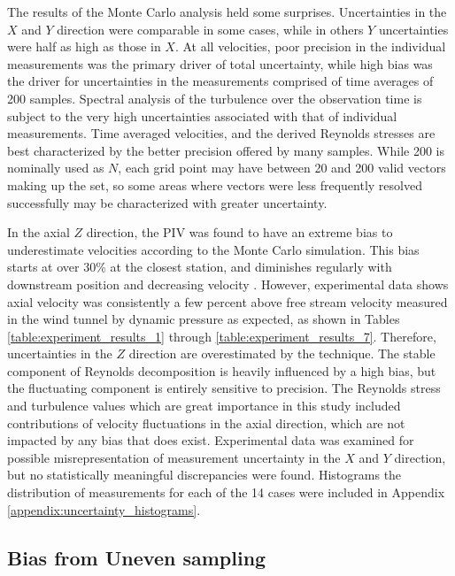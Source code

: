 {



The results of the Monte Carlo analysis held some surprises. Uncertainties in 
the $X$ and $Y$ direction were comparable in some cases, while in others $Y$ 
uncertainties were half as high as those in $X$. At all velocities, poor 
precision in the individual measurements was the primary driver of total 
uncertainty, while high bias was the driver for uncertainties in the 
measurements comprised of time averages of 200 samples. Spectral analysis of 
the turbulence over the observation time is subject to the very high 
uncertainties associated with that of individual measurements. Time averaged 
velocities, and the derived Reynolds stresses are best characterized by the 
better precision offered by many samples. While 200 is nominally used as $N$, 
each grid point may have between 20 and 200 valid vectors making up the set, so 
some areas where vectors were less frequently resolved successfully may be 
characterized with greater uncertainty.

In the axial $Z$ direction, the PIV was found to have an extreme bias to 
underestimate velocities according to the Monte Carlo simulation. This bias 
starts at over 30\% at the closest station, and diminishes regularly with 
downstream position and decreasing velocity . However, experimental data shows 
axial velocity was consistently a few percent above free stream velocity 
measured in the wind tunnel by dynamic pressure as expected, as shown in Tables
\ref{table:experiment_results_1} through \ref{table:experiment_results_7}. 
Therefore, uncertainties in the $Z$ direction are overestimated by the 
technique. The stable component of Reynolds decomposition is heavily influenced 
by a high bias, but the fluctuating component is entirely sensitive to 
precision. The Reynolds stress and turbulence values which are great importance 
in this study included contributions of velocity fluctuations in the axial 
direction, which are not impacted by any bias that does exist. Experimental 
data was examined for possible misrepresentation of measurement uncertainty in 
the $X$ and $Y$ direction, but no statistically meaningful discrepancies were 
found. Histograms the distribution of measurements for each of the 14 
cases were included in Appendix \ref{appendix:uncertainty_histograms}.


\subsection{Bias from Uneven sampling}

}
